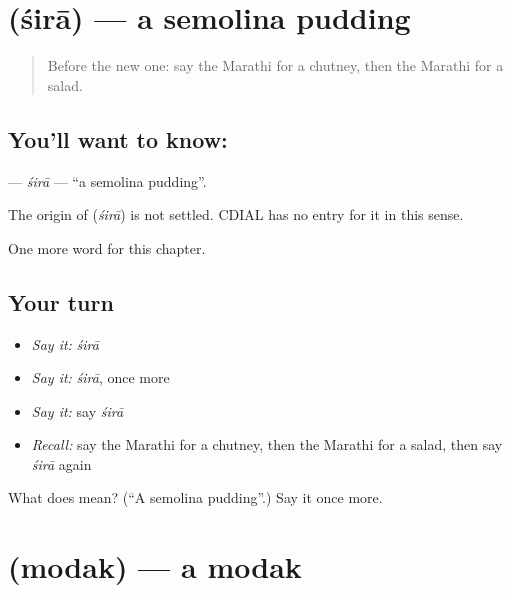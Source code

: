 \section[\texorpdfstring{\mr{शिरा} (śirā)}{शिरा (śirā)}]{ (śirā) — a semolina pudding}

\label{lesson:MR-C186-sira}



\begin{quote}
Before the new one: say the Marathi for a chutney, then the Marathi for a salad.
\end{quote}

\subsection*{You'll want to know: }
\textbf{} — \emph{śirā} — \textquotedblleft{}a semolina pudding\textquotedblright{}.

\begin{cousinweb}
The origin of \textbf{} (\emph{śirā}) is not settled. CDIAL has no entry for it in this sense.
\end{cousinweb}

\begin{grammarlens}[title={What you've built}]
One more word for this chapter.
\end{grammarlens}

\subsection*{Your turn}
\begin{itemize}
\raggedright
  \item \emph{Say it:} \emph{śirā}
  \item \emph{Say it:} \emph{śirā}, once more
  \item \emph{Say it:} say \emph{śirā}
  \item \emph{Recall:} say the Marathi for a chutney, then the Marathi for a salad, then say \emph{śirā} again
\end{itemize}

\begin{tcolorbox}[breakable,colback=teal!4,colframe=teal!35!black,title={Before you move on}]
What does  mean? (\textquotedblleft{}A semolina pudding\textquotedblright{}.) Say it once more.
\end{tcolorbox}
\section[\texorpdfstring{\mr{मोदक} (modak)}{मोदक (modak)}]{ (modak) — a modak}

